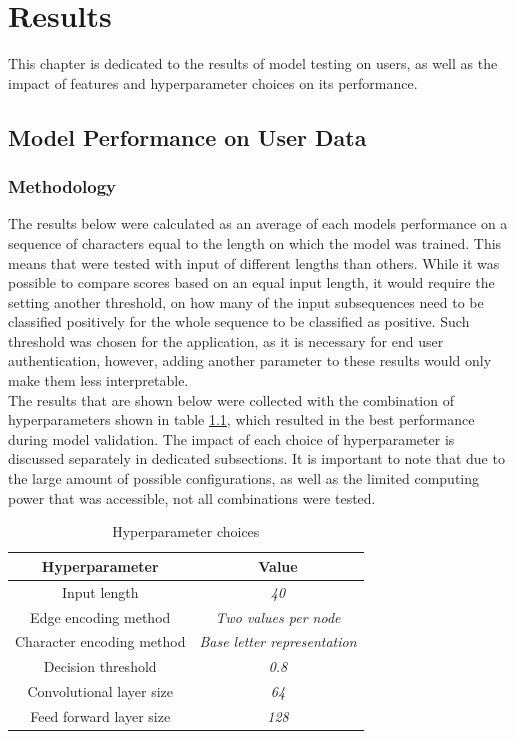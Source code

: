 
\chapter{Results}
This chapter is dedicated to the results of model testing on users, as well as the impact of features and hyperparameter choices on its performance. 

\section{Model Performance on User Data}

\subsection{Methodology}
The results below were calculated as an average of each models performance on a sequence of characters equal to the length on which the model was trained.
This means that were tested with input of different lengths than others. 
While it was possible to compare scores based on an equal input length,
it would require the setting another threshold, on how many of the input subsequences need to be classified positively for the whole sequence to be classified as positive. 
Such threshold was chosen for the application, as it is necessary for end user authentication, however, adding another parameter to these results would only make them less interpretable.\\
The results that are shown below were collected with the combination of hyperparameters shown in table \ref{table:hyperparams}, which resulted in the best performance during model validation. The impact of each choice of hyperparameter is discussed separately in dedicated subsections. It is important to note that due to the large amount of possible configurations, as well as the limited computing power that was accessible, not all combinations were tested.

\begin{center}
	\begin{table}[H]
		
\begin{center}
	\begin{tabular}{ |c|c|} 
		\hline
		Hyperparameter & Value \\
		\hline
		Input length & \textit{40} \\ 
		\hline
		Edge encoding method & \textit{Two values per node} \\		
		\hline 
		Character encoding method & \textit{Base letter representation} \\		 
		\hline
		Decision threshold & \textit{0.8} \\
		\hline
		Convolutional layer size & \textit{64} \\
		\hline
		Feed forward layer size & \textit{128} \\
		\hline
	\end{tabular}
\end{center}
	\caption{Hyperparameter choices}
	\label{table:hyperparams}
	\end{table}
\end{center}


